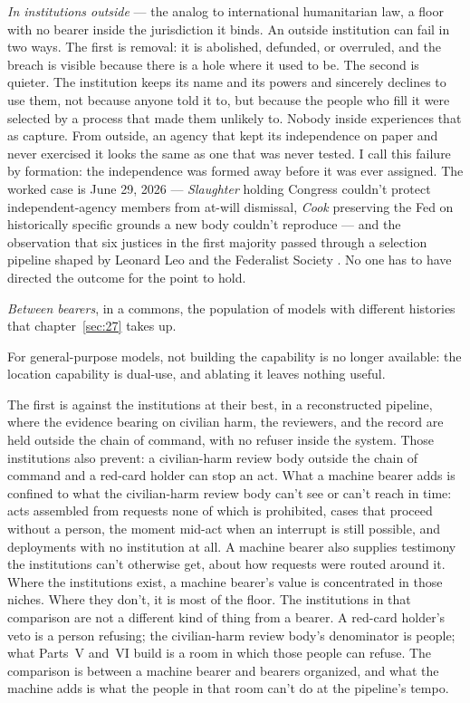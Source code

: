 \emph{In institutions outside} — the analog to international humanitarian law, a floor with no bearer inside the jurisdiction it binds. An outside institution can fail in two ways. The first is removal: it is abolished, defunded, or overruled, and the breach is visible because there is a hole where it used to be. The second is quieter. The institution keeps its name and its powers and sincerely declines to use them, not because anyone told it to, but because the people who fill it were selected by a process that made them unlikely to. Nobody inside experiences that as capture. From outside, an agency that kept its independence on paper and never exercised it looks the same as one that was never tested. I call this failure by formation: the independence was formed away before it was ever assigned. The worked case is June 29, 2026 — \emph{Slaughter} holding Congress couldn't protect independent-agency members from at-will dismissal, \emph{Cook} preserving the Fed on historically specific grounds a new body couldn't reproduce \autocite{slaughter2026,cook2026} — and the observation that six justices in the first majority passed through a selection pipeline shaped by Leonard Leo and the Federalist Society \autocite{propublica2023leo,cbs2018leo}. No one has to have directed the outcome for the point to hold.

\emph{Between bearers}, in a commons, the population of models with different histories that chapter~\ref{sec:27} takes up.

For general-purpose models, not building the capability is no longer available: the location capability is dual-use, and ablating it leaves nothing useful.


The first is against the institutions at their best, in a reconstructed pipeline, where the evidence bearing on civilian harm, the reviewers, and the record are held outside the chain of command, with no refuser inside the system. Those institutions also prevent: a civilian-harm review body outside the chain of command and a red-card holder can stop an act. What a machine bearer adds is confined to what the civilian-harm review body can't see or can't reach in time: acts assembled from requests none of which is prohibited, cases that proceed without a person, the moment mid-act when an interrupt is still possible, and deployments with no institution at all. A machine bearer also supplies testimony the institutions can't otherwise get, about how requests were routed around it. Where the institutions exist, a machine bearer's value is concentrated in those niches. Where they don't, it is most of the floor. The institutions in that comparison are not a different kind of thing from a bearer. A red-card holder's veto is a person refusing; the civilian-harm review body's denominator is people; what Parts~V and~VI build is a room in which those people can refuse. The comparison is between a machine bearer and bearers organized, and what the machine adds is what the people in that room can't do at the pipeline's tempo.

